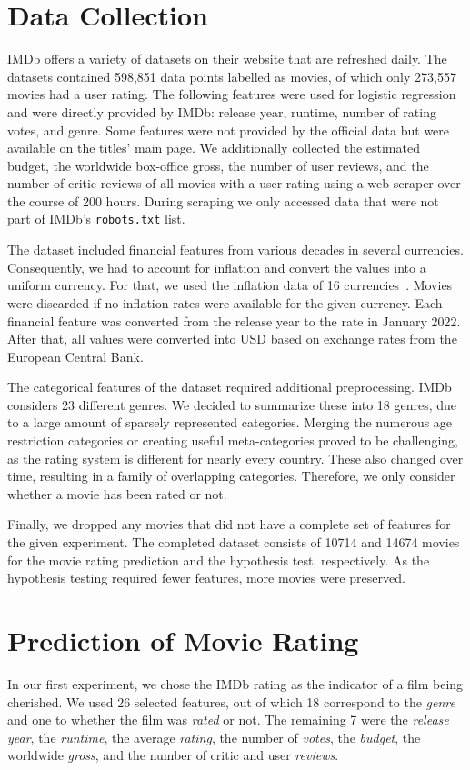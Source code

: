 \documentclass{article}
\begin{document}
\section{Data Collection}
IMDb offers a variety of datasets on their website that are refreshed daily. The datasets contained 598,851 data points labelled as movies, of which only 273,557 movies had a user rating. The following features were used for logistic regression and were directly provided by IMDb: release year, runtime, number of rating votes, and genre. Some features were not provided by the official data but were available on the titles' main page. We additionally collected the estimated budget, the worldwide box-office gross, the number of user reviews, and the number of critic reviews of all movies with a user rating using a web-scraper over the course of 200 hours. During scraping we only accessed data that were not part of IMDb's \verb"robots.txt" list. 

The dataset included financial features from various decades in several currencies. Consequently, we had to account for inflation and convert the values into a uniform currency. For that, we used the inflation data of 16 currencies~\cite{test}. Movies were discarded if no inflation rates were available for the given currency. Each financial feature was converted from the release year to the rate in January 2022. After that, all values were converted into USD based on exchange rates from the European Central Bank.

The categorical features of the dataset required additional preprocessing. IMDb considers 23 different genres. We decided to summarize these into 18 genres, due to a large amount of sparsely represented categories. Merging the numerous age restriction categories or creating useful meta-categories proved to be challenging, as the rating system is different for nearly every country. These also changed over time, resulting in a family of overlapping categories. Therefore, we only consider whether a movie has been rated or not.

Finally, we dropped any movies that did not have a complete set of features for the given experiment. The completed dataset consists of 10714 and 14674 movies for the movie rating prediction and the hypothesis test, respectively. As the hypothesis testing required fewer features, more movies were preserved.

\section{Prediction of Movie Rating}
In our first experiment, we chose the IMDb rating as the indicator of a film being cherished. We used 26 selected features, out of which 18 correspond to the \emph{genre} and one to whether the film was \emph{rated} or not. The remaining 7 were the \emph{release year}, the \emph{runtime}, the average \emph{rating}, the number of \emph{votes}, the \emph{budget}, the worldwide \emph{gross}, and the number of critic and user \emph{reviews}.
\end{document}
